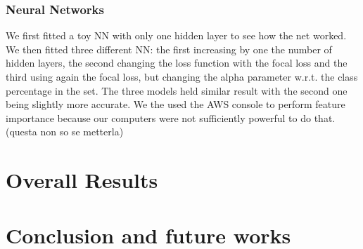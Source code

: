 \documentclass[a4paper,11pt, oneside]{article}  %
\begin{document}
	\subsubsection{Neural Networks}
	We first fitted a toy NN with only one hidden layer to see how the net worked.
	We then fitted three different NN: the first increasing by one the number of hidden layers, the second changing the loss function with the focal loss and the third using again the focal loss, but changing the alpha parameter w.r.t. the class percentage in the set.
	The three models held similar result with the second one being slightly more accurate. We the used the AWS console to perform feature importance because our computers were not sufficiently powerful to do that. (questa non so se metterla)
	
	\section{Overall Results}
	
	
	\section{Conclusion and future works}
	
	
\end{document}
